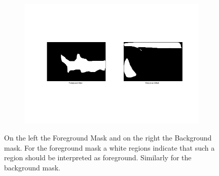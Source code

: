 \documentclass{paper}
\begin{document}
\begin{figure}[H]
    \centering
    \begin{subfigure}{1.0\textwidth}
        \includegraphics[width=\textwidth]{../../outputs/p4/image_segmentation/zebra2/masks}
    \end{subfigure}
    \caption{On the left the Foreground Mask and on the right the Background mask. For the foreground mask a white regions indicate that such a region should be interpreted as foreground. Similarly for the background mask.}
    \label{fig:segmentation_zebra2_masks}       
\end{figure}
\end{document}
